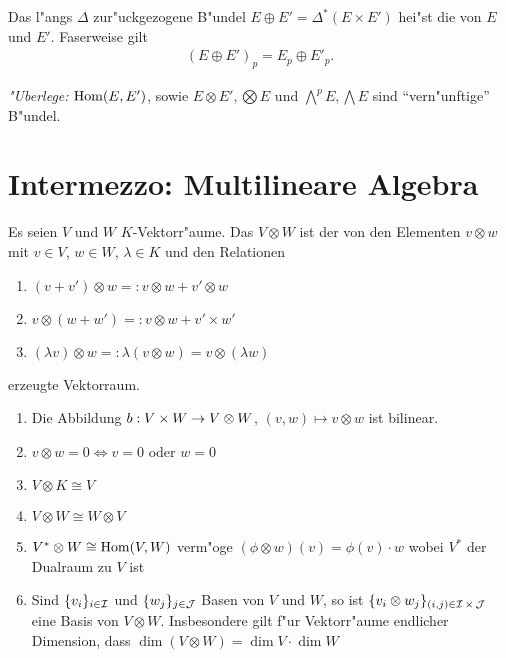 \begin{center}\end{center}

Das l"angs $\Delta$ zur"uckgezogene B"undel $E \oplus E' = \Delta^{\ast}(E \times E')$ hei"st die  von $E$ und $E'$.
Faserweise gilt
\begin{align*}
  (E \oplus E')_p = E_p \oplus E'_p.
\end{align*}
 
\emph{"Uberlege:} $\operatorname{Hom}(E,E')$, sowie $E \otimes E', \bigotimes E$ und $\bigwedge^pE, \bigwedge E$ sind "`vern"unftige"' B"undel.


\section{Intermezzo: Multilineare Algebra}

Es seien $V$ und $W$ $K$-Vektorr"aume. Das  $V \otimes W$ ist der von den Elementen $v \otimes w$ mit $v \in V$, $w \in W$, $\lambda \in K$ und den Relationen
\begin{enumerate}[label=(\roman*),widest=iii]
\item
	$(v + v') \otimes w =: v \otimes w + v' \otimes w$
\item
	$v \otimes (w + w') =: v \otimes w + v' \times w'$
\item
	$(\lambda v) \otimes w =: \lambda (v \otimes w) = v \otimes (\lambda w)$
\end{enumerate} erzeugte Vektorraum.

\begin{emptythm}[Eigenschaften:]
\begin{enumerate}[label=(\arabic*),leftmargin=*]
\item Die Abbildung $b: V \times W \to V \otimes W$, $(v, w) \mapsto v \otimes w$ ist bilinear.
\item $v \otimes w = 0 \Leftrightarrow v = 0$ oder $w = 0$
\item $V \otimes K \cong V$
\item $V \otimes W \cong W \otimes V$
\item $V^* \otimes W \cong \operatorname{Hom}(V, W)$ verm"oge $(\phi \otimes w)(v) = \phi(v) \cdot w$ wobei $V^*$ der \gls{Dualraum} zu $V$ ist
\item Sind $\{v_i\}_{i \in \operatorname{\mathcal{I}}}$ und $\{w_j\}_{j \in \operatorname{\mathcal{J}}}$ Basen von $V$ und $W$, so ist $\{v_i \otimes w_j\}_{(i,j) \in \operatorname{\mathcal{I}} \times \operatorname{\mathcal{J}}}$ eine Basis von $V \otimes W$. Insbesondere gilt f"ur Vektorr"aume endlicher Dimension, dass $\dim (V \otimes W) = \dim V \cdot \dim W$
\end{enumerate}
\end{emptythm}

